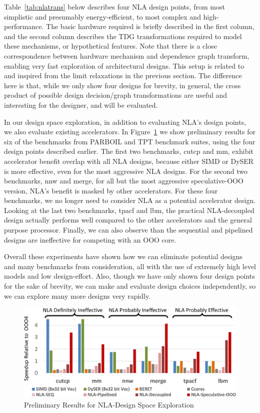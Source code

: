 Table~\ref{tab:nlatrans} below describes four NLA design points, from most simplistic
and presumably energy-efficient, to most complex and high-performance.  The basic
hardware required is briefly described in the first column, and the second column
describes the TDG transformations required to model these mechanisms, or hypothetical
features.  Note that there is a close correspondence between hardware mechanism and
dependence graph transform, enabling very fast exploration of architectural designs.
This setup is related to and inspired from the limit relaxations in the
previous section.  The difference here is that, while we only show four designs 
for brevity, in general, the cross product of possible design 
decision/graph transformations are useful and interesting for the designer, and will
be evaluated.

In our design space exploration, in addition to evaluating NLA's design points,
we also evaluate existing accelerators.  In Figure~\ref{fig:nla-prelim} we show
preliminary results for six of the benchmarks from PARBOIL and TPT benchmark
suites, using the four design points described earlier.  The first two
benchmarks, cutcp and mm, exhibit accelerator benefit overlap with all NLA
designs, because either SIMD or DySER is more effective, even for the most
aggressive NLA designs.  For the second two benchmarks, nnw and merge, for all but
the most aggressive speculative-OOO version, NLA's benefit is masked by other
accelerators.  For these four benchmarks, we no longer need to consider NLA as a potential
accelerator design.  Looking at the last two benchmarks, tpacf and lbm, the practical
NLA-decoupled design actually performs well compared to the other accelerators and the
general purpose processor.  Finally, we can also observe than the sequential and 
pipelined designs are ineffective for competing with an OOO core.

Overall these experiments have shown how we can eliminate potential designs and
many benchmarks from consideration, all with the use of extremely high level
models and low design-effort.  Also, though we have only shown four design points for
the sake of brevity, we can make and evaluate design choices independently, so
we can explore many more designs very rapidly.

\begin{figure}
\begin{center}
\includegraphics[width=0.68\linewidth]{figs/nla-results-slide.pdf} 
\end{center}
\vspace{-0.1in}
\caption{Preliminary Results for NLA-Design Space Exploration}
\label{fig:nla-prelim}
\end{figure}

